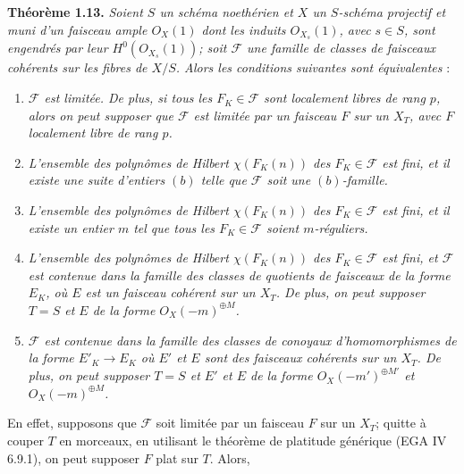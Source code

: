 
\textbf{Théorème 1.13.}
\emph{Soient \(S\) un schéma noethérien et \(X\) un \(S\)-schéma projectif et muni d'un faisceau ample \({O}_X(1)\) dont les induits \({O}_{X_s}(1)\), avec \(s\in S\), sont engendrés par leur \(H^0({O}_{X_s}(1))\); soit \(\mathcal F\) une famille de classes de faisceaux cohérents sur les fibres de \(X/S\). Alors les conditions suivantes sont équivalentes} :
\begin{enumerate}[label=(\roman*)]
\item \emph{\(\mathcal F\) est limitée. De plus, si tous les \(F_K\in\mathcal F\) sont localement libres de rang \(p\), alors on peut supposer que \(\mathcal F\) est limitée par un faisceau \(F\) sur un \(X_T\), avec \(F\) localement libre de rang \(p\).}
\item \emph{L'ensemble des polynômes de Hilbert \(\chi(F_K(n))\) des \(F_K\in\mathcal F\) est fini, et il existe une suite d'entiers \((b)\) telle que \(\mathcal F\) soit une \((b)\)-famille.}
\item \emph{L'ensemble des polynômes de Hilbert \(\chi(F_K(n))\) des \(F_K\in\mathcal F\) est fini, et il existe un entier \(m\) tel que tous les \(F_K\in\mathcal F\) soient \(m\)-réguliers.}
\item \emph{L'ensemble des polynômes de Hilbert \(\chi(F_K(n))\) des \(F_K\in\mathcal F\) est fini, et \(\mathcal F\) est contenue dans la famille des classes de quotients de faisceaux de la forme \(E_K\), où \(E\) est un faisceau cohérent sur un \(X_T\). De plus, on peut supposer \(T=S\) et \(E\) de la forme \({O}_X(-m)^{\oplus M}\).}
\item \emph{\(\mathcal F\) est contenue dans la famille des classes de conoyaux d'homomorphismes de la forme \(E'_K\to E_K\) où \(E'\) et \(E\) sont des faisceaux cohérents sur un \(X_T\). De plus, on peut supposer \(T=S\) et \(E'\) et \(E\) de la forme \({O}_X(-m')^{\oplus M'}\) et \({O}_X(-m)^{\oplus M}\).}
\end{enumerate}
En effet, supposons que \(\mathcal F\) soit limitée par un faisceau \(F\) sur un \(X_T\); quitte à couper \(T\) en morceaux, en utilisant le théorème de platitude générique (EGA IV 6.9.1), on peut supposer \(F\) plat sur \(T\). Alors,
